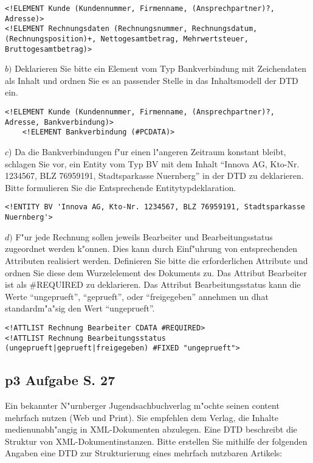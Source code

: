 \lstset{style=customXML}
\begin{lstlisting}
<!ELEMENT Kunde (Kundennummer, Firmenname, (Ansprechpartner)?, Adresse)>
<!ELEMENT Rechnungsdaten (Rechnungsnummer, Rechnungsdatum, (Rechnungsposition)+, Nettogesamtbetrag, Mehrwertsteuer, Bruttogesamtbetrag)>
\end{lstlisting}

\noindent
$b)$ Deklarieren Sie bitte ein Element vom Typ Bankverbindung mit Zeichendaten als Inhalt und ordnen Sie es an passender Stelle in das Inhaltsmodell der DTD ein.\\
\lstset{style=customXML}
\begin{lstlisting}
<!ELEMENT Kunde (Kundennummer, Firmenname, (Ansprechpartner)?, Adresse, Bankverbindung)>
    <!ELEMENT Bankverbindung (#PCDATA)>
\end{lstlisting}

\noindent
$c$) Da die Bankverbindungen f"ur einen l"angeren Zeitraum konstant bleibt, schlagen Sie vor, ein Entity vom Typ BV mit dem Inhalt "`Innova AG, Kto-Nr. 1234567, BLZ 76959191, Stadtsparkasse Nuernberg"' in der DTD zu deklarieren.
Bitte formulieren Sie die Entsprechende Entitytypdeklaration.\\

\lstset{style=customXML}
\begin{lstlisting}
<!ENTITY BV 'Innova AG, Kto-Nr. 1234567, BLZ 76959191, Stadtsparkasse Nuernberg'>
\end{lstlisting}

\noindent
$d)$ F"ur jede Rechnung sollen jeweils Bearbeiter und Bearbeitungsstatus zugeordnet werden k"onnen.
Dies kann durch Einf"uhrung von entsprechenden Attributen realisiert werden.
Definieren Sie bitte die erforderlichen Attribute und ordnen Sie diese dem Wurzelelement des Dokuments zu.
Das Attribut Bearbeiter ist als \#REQUIRED zu deklarieren.
Das Attribut Bearbeitungsstatus kann die Werte "`ungeprueft"', "`geprueft"', oder "`freigegeben"' annehmen un dhat standardm"a"sig den Wert "`ungeprueft"'.

\lstset{style=customXML}
\begin{lstlisting}
<!ATTLIST Rechnung Bearbeiter CDATA #REQUIRED>
<!ATTLIST Rechnung Bearbeitungsstatus (ungeprueft|geprueft|freigegeben) #FIXED "ungeprueft">
\end{lstlisting}

\subsection{p3 Aufgabe S. 27}
Ein bekannter N"urnberger Jugendsachbuchverlag m"ochte seinen content mehrfach nutzen (Web und Print). 
Sie empfehlen dem Verlag, die Inhalte medienunabh"angig in XML-Dokumenten abzulegen.
Eine DTD beschreibt die Struktur von XML-Dokumentinstanzen.
Bitte erstellen Sie mithilfe der folgenden Angaben eine DTD zur Strukturierung eines mehrfach nutzbaren Artikels:\\

